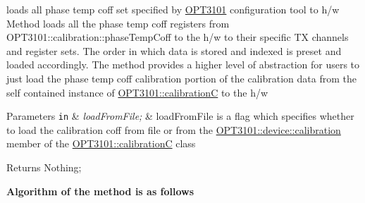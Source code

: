 loads all phase temp coff set specified by \mbox{\hyperlink{namespace_o_p_t3101}{O\+P\+T3101}} configuration tool to h/w Method loads all the phase temp coff registers from O\+P\+T3101\+::calibration\+::phase\+Temp\+Coff to the h/w to their specific TX channels and register sets. The order in which data is stored and indexed is preset and loaded accordingly. The method provides a higher level of abstraction for users to just load the phase temp coff calibration portion of the calibration data from the self contained instance of \mbox{\hyperlink{class_o_p_t3101_1_1calibration_c}{O\+P\+T3101\+::calibrationC}} to the h/w 


\begin{DoxyParams}[1]{Parameters}
\mbox{\tt in}  & {\em load\+From\+File;} & load\+From\+File is a flag which specifies whether to load the calibration coff from file or from the \mbox{\hyperlink{class_o_p_t3101_1_1device_a808c6e99f30fc4f21bee018f351f560d}{O\+P\+T3101\+::device\+::calibration}} member of the \mbox{\hyperlink{class_o_p_t3101_1_1calibration_c}{O\+P\+T3101\+::calibrationC}} class \\
\hline
\end{DoxyParams}
\begin{DoxyReturn}{Returns}
Nothing; 
\end{DoxyReturn}
{\bfseries Algorithm of the method is as follows}


